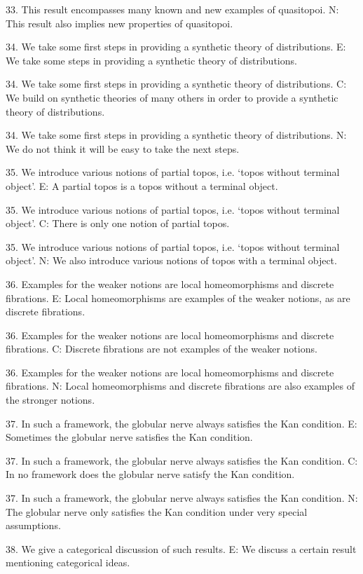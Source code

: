 33. This result encompasses many known and new examples of quasitopoi.
N:  This result also implies new properties of quasitopoi.

34. We take some first steps in providing a synthetic theory of distributions.
E: We take some steps in providing a synthetic theory of distributions.

34. We take some first steps in providing a synthetic theory of distributions.
C: We build on synthetic theories of many others in order to provide a synthetic theory of distributions.

34. We take some first steps in providing a synthetic theory of distributions.
N: We do not think it will be easy to take the next steps.

35. We introduce various notions of partial topos, i.e. `topos without terminal object'.
E:  A partial topos is a topos without a terminal object.

35. We introduce various notions of partial topos, i.e. `topos without terminal object'.
C:  There is only one notion of partial topos.

35. We introduce various notions of partial topos, i.e. `topos without terminal object'.
N:  We also introduce various notions of topos with a terminal object.

36. Examples for the weaker notions are local homeomorphisms and discrete fibrations.
E:  Local homeomorphisms are examples of the weaker notions, as are discrete fibrations.

36. Examples for the weaker notions are local homeomorphisms and discrete fibrations.
C: Discrete fibrations are not examples of the weaker notions.

36. Examples for the weaker notions are local homeomorphisms and discrete fibrations.
N: Local homeomorphisms and discrete fibrations are also examples of the stronger notions.

37. In such a framework, the globular nerve always satisfies the Kan condition.
E:  Sometimes the globular nerve satisfies the Kan condition.

37. In such a framework, the globular nerve always satisfies the Kan condition.
C:  In no framework does the globular nerve satisfy the Kan condition.

37. In such a framework, the globular nerve always satisfies the Kan condition.
N:  The globular nerve only satisfies the Kan condition under very special assumptions.

38. We give a categorical discussion of such results.
E:  We discuss a certain result mentioning categorical ideas.

